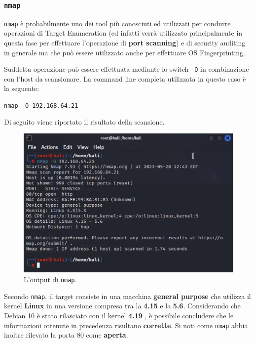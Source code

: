 \documentclass[a4paper, 12pt, oneside]{article}
\begin{document}
\subsubsection{\texttt{nmap}}
\texttt{nmap} è probabilmente uno dei tool più conosciuti ed utilizzati per condurre operazioni di Target Enumeration (ed infatti verrà utilizzato principalmente in questa fase per effettuare l'operazione di \textbf{port scanning}) e di security auditing in generale ma che può essere utilizzato anche per effettuare OS Fingerprinting.\cite{nmap}

Suddetta operazione può essere effettuata mediante lo switch \texttt{-O} in combinazione con l'host da scansionare. La command line completa utilizzata in questo caso è la seguente:

\begin{center}
    \texttt{nmap -O 192.168.64.21}
\end{center}

Di seguito viene riportato il risultato della scansione.

\begin{figure}[h!]
    \centering
    \includegraphics[width=\textwidth]{img/nmap-os.png}
    \caption{L'output di \texttt{nmap}.}
\end{figure}

Secondo \texttt{nmap}, il target consiste in una macchina \textbf{general purpose} che utilizza il kernel \textbf{Linux} in una versione compresa tra la \textbf{4.15} e la \textbf{5.6}. Considerando che Debian 10 è stato rilasciato con il kernel \textbf{4.19} \cite{debian}, è possibile concludere che le informazioni ottenute in precedenza risultano \textbf{corrette}. Si noti come \texttt{nmap} abbia inoltre rilevato la porta 80 come \textbf{aperta}.
\end{document}

